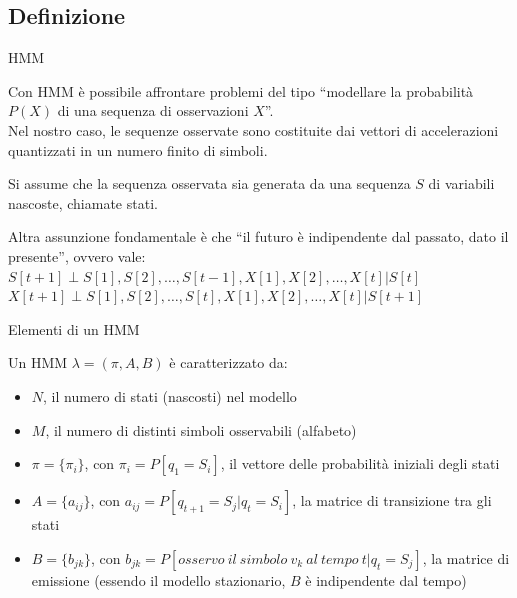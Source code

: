 \documentclass[hyperref={pdfpagelabels=false},slidestop,mathserif,red]{beamer}
\begin{document}
\subsection{Definizione}

\begin{frame}{HMM}
 \begin{block}{}
  Con HMM \`e possibile affrontare problemi del tipo ``modellare la probabilit\`a $P(X)$ di una sequenza di osservazioni $X$''.\\
Nel nostro caso, le sequenze osservate sono costituite dai vettori di accelerazioni quantizzati in un numero finito di simboli.
 \end{block}

 \begin{block}{}
  Si assume che la sequenza osservata sia generata da una sequenza $S$ di variabili nascoste, chiamate stati.

  Altra assunzione fondamentale \`e che ``il futuro \`e indipendente dal passato, dato il presente'', ovvero vale: \\
$S[t+1] \perp S[1], S[2], \ldots, S[t-1], X[1], X[2], \ldots, X[t] | S[t]$ \\
$X[t+1] \perp S[1], S[2], \ldots, S[t], X[1], X[2], \ldots, X[t] | S[t+1]$
 \end{block}
\end{frame}


\begin{frame}{Elementi di un HMM}
 \begin{block}{}
  Un HMM $\lambda = (\pi, A, B)$ \`e caratterizzato da:
	\begin{itemize}
		\item $N$, il numero di stati (nascosti) nel modello
		\item $M$, il numero di distinti simboli osservabili (alfabeto)
	 \item $\pi = \{\pi_{i}\}$, con $\pi_{i} = P[q_{1} = S_{i}]$, il vettore delle probabilit\`a iniziali degli stati
 	 \item $A = \{a_{ij}\}$, con $a_{ij} = P[q_{t+1} = S_{j} | q_{t} = S_{i}]$, la matrice di transizione tra gli stati
 	 \item $B = \{b_{jk}\}$, con $b_{jk} = P[osservo\ il\ simbolo\ v_{k}\ al\ tempo\ t | q_{t} = S_{j}]$, la matrice di emissione (essendo il modello stazionario, $B$ \`e indipendente dal tempo)
	\end{itemize}

 \end{block}

\end{frame}
\end{document}
